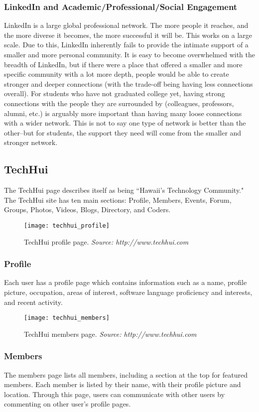 \subsubsection{LinkedIn and Academic/Professional/Social Engagement}
LinkedIn is a large global professional network. The more people it reaches, and the more diverse it becomes, the more successful it will be. This works on a large scale. Due to this, LinkedIn inherently fails to provide the intimate support of a smaller and more personal community. It is easy to become overwhelmed with the breadth of LinkedIn, but if there were a place that offered a smaller and more specific community with a lot more depth, people would be able to create stronger and deeper connections (with the trade-off being having less connections overall). For students who have not graduated college yet, having strong connections with the people they are surrounded by (colleagues, professors, alumni, etc.) is arguably more important than having many loose connections with a wider network. This is not to say one type of network is better than the other--but for students, the support they need will come from the smaller and stronger network. 

\subsection{TechHui}
The TechHui page describes itself as being ``Hawaii's Technology Community." \cite{TechHui} The TechHui site has ten main sections: Profile, Members, Events, Forum, Groups, Photos, Videos, Blogs, Directory, and Coders.

\begin{figure}[h]
\centering
\texttt{[image: techhui\_profile]}
\caption{TechHui profile page. \textit{Source: http://www.techhui.com}}
\end{figure}
\subsubsection{Profile}
Each user has a profile page which contains information such as a name, profile picture, occupation, areas of interest, software language proficiency and interests, and recent activity.

\begin{figure}[h]
\centering
\texttt{[image: techhui\_members]}
\caption{TechHui members page. \textit{Source: http://www.techhui.com}}
\end{figure}
\subsubsection{Members}
The members page lists all members, including a section at the top for featured members. Each member is listed by their name, with their profile picture and location. Through this page, users can communicate with other users by commenting on other user's profile pages.


